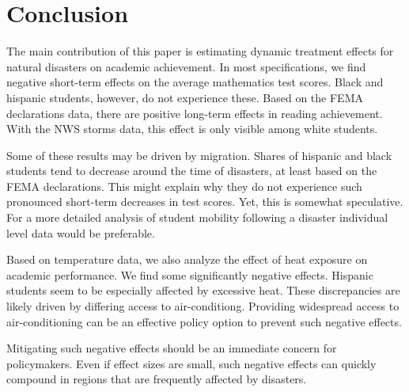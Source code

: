 \section{Conclusion} \label{Conclusion}

The main contribution of this paper is estimating dynamic treatment effects for natural disasters on academic achievement. In most specifications, we find negative short-term effects on the average mathematics test scores. Black and hispanic students, however, do not experience these. Based on the FEMA declarations data, there are positive long-term effects in reading achievement. With the NWS storms data, this effect is only visible among white students.

Some of these results may be driven by migration. Shares of hispanic and black students tend to decrease around the time of disasters, at least based on the FEMA declarations. This might explain why they do not experience such pronounced short-term decreases in test scores. Yet, this is somewhat speculative. For a more detailed analysis of student mobility following a disaster individual level data would be preferable.

Based on temperature data, we also analyze the effect of heat exposure on academic performance. We find some significantly negative effects. Hispanic students seem to be especially affected by excessive heat. These discrepancies are likely driven by differing access to air-conditiong. Providing widespread access to air-conditioning can be an effective policy option to prevent such negative effects.

Mitigating such negative effects should be an immediate concern for policymakers. Even if effect sizes are small, such negative effects can quickly compound in regions that are frequently affected by disasters. 





